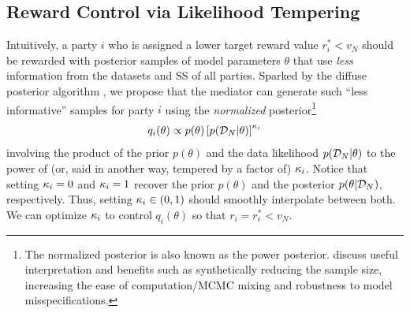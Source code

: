 \documentclass{article}
\theoremstyle{plain}
\theoremstyle{definition}
\theoremstyle{remark}
\begin{document}
\subsection{Reward Control via Likelihood Tempering}\label{sec:temper}

Intuitively, a party $i$ who is assigned a lower target reward value $r^*_i < v_N$ should be rewarded with posterior samples of model parameters $\theta$ that use \emph{less} information from the datasets and SS of all parties.
Sparked by the diffuse posterior algorithm \cite{geumlek17rdps}, we propose that the mediator can generate such ``less informative'' samples for party $i$ using the \emph{normalized} posterior\footnote{The normalized posterior is also known as the power posterior. \cite{miller2018coarsen} discuss useful interpretation and benefits such as synthetically reducing the sample size, increasing the ease of computation/MCMC mixing and robustness to model misspecifications.}
\begin{equation}
q_i(\theta) \propto p(\theta) \left[p(\gD_N|\theta)\right]^{\scalei}   \label{eq:m4}%
\end{equation}
involving the product of the prior $p(\theta)$ and the data likelihood $p({\mathcal{D}}_N|\theta)$ to the power of (or, said in another way, tempered by a factor of) ${\kappa_i}$. Notice that setting ${\kappa_i}=0$ and ${\kappa_i}=1$ recover the prior $p(\theta)$ and the posterior $p(\theta|{\mathcal{D}}_N)$, respectively. Thus, setting ${\kappa_i} \in (0, 1)$ should smoothly interpolate between both. We can optimize ${\kappa_i}$ to control $q_i(\theta)$ so that $r_i = r^*_i < v_N$.%
\end{document}
